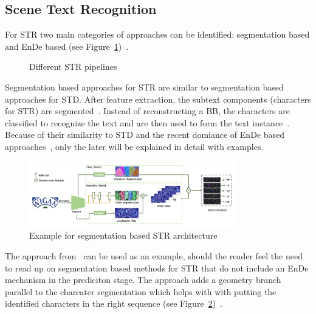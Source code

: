 \subsection{Scene Text Recognition}
For \ac{STR} two main categories of approaches can be identified: segmentation based and
\ac{EnDe} based (see Figure~\ref{fig:str-pipelines})~\citep{chen_text_2021}.
\begin{figure}[h]
    \centering
    
    \caption{Different STR pipelines\label{fig:str-pipelines}}
\end{figure}
Segmentation based approaches for \ac{STR} are similar to segmentation based approaches for \ac{STD}.
After feature extraction, the subtext components (characters for \ac{STR}) are
segmented~\citep{chen_text_2021}.
Instead of reconstructing a \ac{BB}, the characters are classified to recognize the
text and are then used to form the text instance~\citep{chen_text_2021}.
Because of their similarity to \ac{STD} and the recent domiance of \ac{EnDe} based
approaches~\citep{chen_text_2021,long_scene_2021}, only the later will be explained in detail with
examples.
\begin{figure}[hb]
    \centering
    \includegraphics[width=0.8\textwidth]{img/STR-seg-based-wan-textscaner-2020.png}
    \caption[Segmentation based STR architecture]{%
        Example for segmentation based STR
        architecture~\citep{wan_textscanner_2020}\label{fig:STR-segbased-architecture}
    }
\end{figure}
The approach from~\cite{wan_textscanner_2020} can be used as an example, should the reader feel the
need to read up on segmentation based methods for \ac{STR} that do not include an \ac{EnDe}
mechanism in the prediciton stage.
The approach adds a geometry branch parallel to the charcater segmentation which helps with with
putting the identified characters in the right sequence (see
Figure~\ref{fig:STR-segbased-architecture})~\citep{wan_textscanner_2020}.


